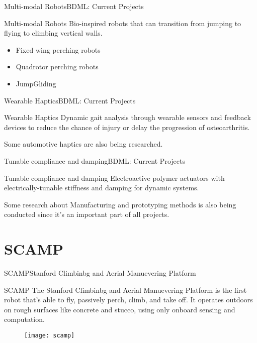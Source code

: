 \documentclass{beamer}
\begin{document}
\begin{frame}{Multi-modal Robots}{BDML: Current Projects}
\begin{block}{Multi-modal Robots}
Bio-inspired robots that can transition from jumping to flying to climbing vertical walls.
\end{block}

\begin{itemize}
  \item Fixed wing perching robots
  \item \alert{Quadrotor perching robots}
  \item JumpGliding
\end{itemize}
\end{frame}

\begin{frame}{Wearable Haptics}{BDML: Current Projects}
\begin{block}{Wearable Haptics}
Dynamic gait analysis through wearable sensors and feedback devices to reduce the chance of injury or delay the progression of osteoarthritis.
\end{block}

\vspace{3ex}

Some automotive haptics are also being researched.
\end{frame}

\begin{frame}{Tunable compliance and damping}{BDML: Current Projects}

  \begin{block}{Tunable compliance and damping}
  Electroactive polymer actuators with electrically-tunable stiffness and damping for dynamic systems.
  \end{block}

  Some research about Manufacturing and prototyping methods is also being conducted since it's an important part of all projects.
\end{frame}

\section{SCAMP}

\begin{frame}{SCAMP}{Stanford Climbinbg and Aerial Manuevering Platform}
\begin{block}{SCAMP}
The Stanford Climbinbg and Aerial Manuevering Platform is the first robot that's able to fly, passively perch, climb, and take off. It operates outdoors on rough surfaces like concrete and stucco, using only onboard sensing and computation.
\end{block}

\begin{figure}[h]
  \centering
  \texttt{[image: scamp]}
  \label{fig:scamp}
\end{figure}
\end{frame}
\end{document}
